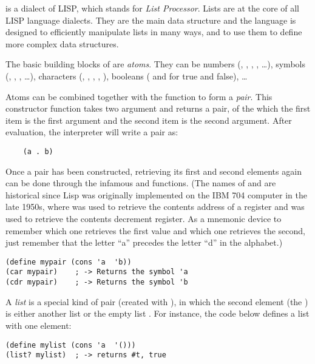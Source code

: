 \documentclass{../../../tp}
\begin{document}
\scheme is a dialect of LISP, which stands for \emph{List Processor}. Lists are at the core of all LISP language dialects. They are the main data structure and the language is designed to efficiently manipulate lists in many ways, and to use them to define more complex data structures.

The basic building blocks of \scheme are \emph{atoms}. They can be numbers (, , , , \ldots), symbols (, , , \ldots), characters (\schemecode{#\a}, \schemecode{#\Z}, \schemecode{#\(}, \schemecode{#\space}, \schemecode{#\newline}), booleans ( and  for true and false), \ldots 

Atoms can be combined together with the  function to form a \emph{pair}. This constructor function takes two argument and returns a pair, of the which the first item is the first argument and the second item is the second argument. After evaluation, the \scheme interpreter will write a pair  as:

\begin{verbatim}
	(a . b)
\end{verbatim}

Once a pair has been constructed, retrieving its first and second elements again can be done through the infamous \car and \cdr functions. (The names of \car and \cdr are historical since Lisp was originally implemented on the IBM 704 computer in the late 1950s, where \car was used to retrieve the contents address of a register and \cdr was used to retrieve the contents decrement register. As a mnemonic device to remember which one retrieves the first value and which one retrieves the second, just remember that the letter ``a'' precedes the letter ``d'' in the alphabet.)

\begin{verbatim}
(define mypair (cons 'a  'b))
(car mypair)	; -> Returns the symbol 'a
(cdr mypair)	; -> Returns the symbol 'b
\end{verbatim}

A \emph{list} is a special kind of pair (created with ), in which the second element (the \cdr) is either another list or the empty list . For instance, the code below defines a list with one element:

\begin{verbatim}
(define mylist (cons 'a  '()))
(list? mylist) 	; -> returns #t, true
\end{verbatim}
\end{document}
